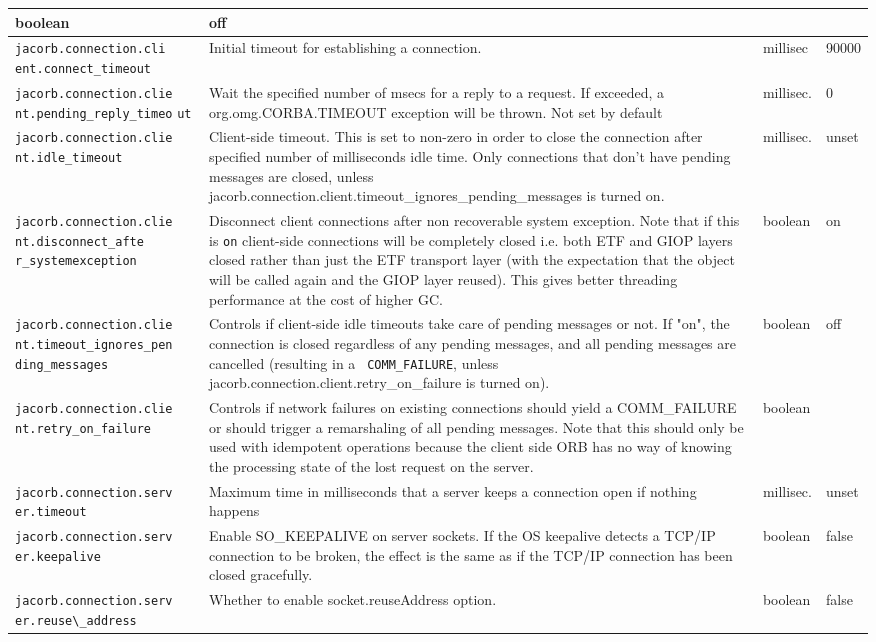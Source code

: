 \begin{small}
\begin{longtable}{|p{5cm}|p{7.5cm}|p{1.5cm}|p{1.5cm}|}
boolean & off \\
\hline
\verb"jacorb.connection.cli"
\verb"ent.connect_timeout" & Initial timeout for establishing a connection.
 & millisec & 90000 \\
\hline
\verb"jacorb.connection.clie"
\verb"nt.pending_reply_timeo"
\verb"ut" &  Wait the specified number of msecs for a reply to a
request. If exceeded, a org.omg.CORBA.TIMEOUT exception will be
thrown. Not set by default & millisec. & 0  \\
\hline
\verb"jacorb.connection.clie"
\verb"nt.idle_timeout" & Client-side timeout. This is set to non-zero in order
to close the connection after specified number of milliseconds idle time. Only
connections that don't have pending messages are closed, unless
jacorb.connection.client.timeout\_ignores\_pending\_messages is turned on. &
millisec. & unset \\
\hline
\verb"jacorb.connection.clie"
\verb"nt.disconnect_afte"
\verb"r_systemexception" & Disconnect client connections after non recoverable system
exception. Note that if this is {\tt on} client-side connections will be
completely closed i.e. both ETF and GIOP layers closed rather than just the ETF
transport layer (with the expectation that the object will be called again and
the GIOP layer reused). This gives better threading performance at the cost of
higher GC. & boolean & on \\

\hline
\verb"jacorb.connection.clie"
\verb"nt.timeout_ignores_pen"
\verb"ding_messages" & Controls if client-side idle timeouts take care of
pending messages or not. If "on", the connection is closed regardless of any
pending messages, and all pending messages are cancelled (resulting in a {\tt
COMM\_FAILURE}, unless jacorb.connection.client.retry\_on\_failure is turned
on).& boolean & off \\
\hline
\verb"jacorb.connection.clie"
\verb"nt.retry_on_failure" & Controls if network failures on existing connections
should yield a COMM\_FAILURE or should trigger a remarshaling
of all pending messages. Note that this should only be used with idempotent
operations because the client side ORB has no way of knowing the processing
state of the lost request on the server. & boolean & \\
\hline
\verb"jacorb.connection.serv"
\verb"er.timeout" & Maximum time in milliseconds that a server keeps a
connection open if nothing happens & millisec. & unset \\
\hline
\verb"jacorb.connection.serv"
\verb"er.keepalive" & Enable SO\_KEEPALIVE on server sockets. If the OS
keepalive detects a TCP/IP connection to be broken, the effect is the same as
if the TCP/IP connection has been closed gracefully. & boolean & false \\
\verb"jacorb.connection.serv"
\verb"er.reuse\_address" & Whether to enable socket.reuseAddress option. & boolean &
false \\
\hline


\end{longtable}
\end{small}
